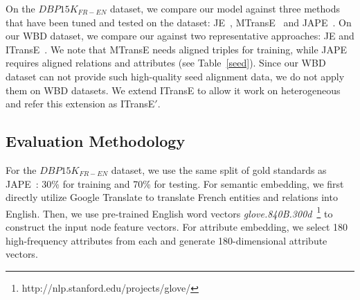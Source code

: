 

    On the $DBP15K_{FR-EN}$ dataset, we compare our \HRGCN model against three methods that have been tuned and tested on the dataset:
    JE~\cite{hao2016joint}, MTransE~\cite{chen2016multilingual} and JAPE~\cite{sun2017cross}. 	On our WBD dataset, we compare our \HRGCN
    against two representative approaches: JE and ITransE~\cite{zhu2017iterative}. We note that MTransE needs aligned triples for training, while JAPE requires aligned relations and attributes (see Table~\ref{seed}). Since our WBD dataset can not provide such high-quality seed alignment data, we do not apply them on WBD datasets. We extend ITransE to allow it work on heterogeneous
    \KGs and refer this extension as ITransE$'$.
%


	
%	



	\subsection{Evaluation Methodology}
    	For the $DBP15K_{FR-EN}$ dataset, we use the same split of gold standards as JAPE~\cite{sun2017cross}: 30\% for training and 70\% for
    testing.
	For semantic embedding, we first directly utilize Google Translate to translate French entities and relations into English.
	Then, we use pre-trained English word vectors \emph{glove.840B.300d}~\footnote{http://nlp.stanford.edu/projects/glove/} to construct the input node feature vectors.
	For attribute embedding, we select 180 high-frequency attributes from each \KG and generate 180-dimensional attribute vectors.	


